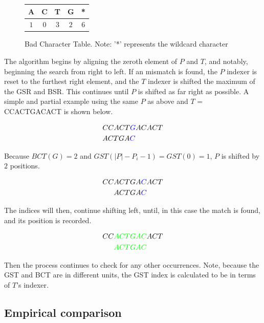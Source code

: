 \documentclass[11pt, letterpaper]{article}
\begin{document}
\begin{figure}[ht]
    \centering
    \begin{tabular}{ |c|c|c|c|c| } 
         \hline
         A & C & T & G & *\\
         \hline
         $1$ & $0$ & $3$ &$2$ & $6$\\
         \hline
    \end{tabular}
    \caption{Bad Character Table. Note: '*' represents the wildcard character}
    \label{fig:GST}
\end{figure}

The algorithm begins by aligning the zeroth element of $P$ and $T$, and notably, beginning the search from right to left. If an mismatch is found, the $P$ indexer is reset to the furthest right element, and the $T$ indexer is shifted the maximum of the GSR and BSR. This continues until $P$ is shifted as far right as possible. A simple and partial example using the same $P$ as above and $T$ = CCACTGACACT is shown below.

\begin{align*}
    &CCA\color{black}CT\color{blue}G\color{black}ACACT \\
    &ACTGA\color{blue}{C}
\end{align*}

Because $BCT(G) = 2$ and $GST(|P| - P_i - 1) = GST(0) = 1$, $P$ is shifted by $2$ positions. 

\begin{align*}
    CC&ACTGA\color{blue}C\color{black}ACT \\
    &ACTGA\color{blue}{C}
\end{align*}

The indices will then, continue shifting left, until, in this case the match is found, and its position is recorded.

\begin{align*}
    CC&\color{green}ACTGAC\color{black}ACT \\
    &\color{green}ACTGAC
\end{align*}

Then the process continues to check for any other occurrences. Note, because the GST and BCT are in different units, the GST index is calculated to be in terms of $T$'s indexer. 

\subsection{Empirical comparison}
\end{document}
